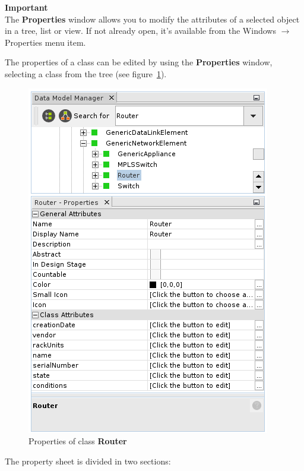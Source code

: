 \documentclass[a4paper]{article}
\begin{document}
			\begin{framed} {\large \textbf{Important}} \\
					The \textbf{Properties} window allows you to modify the attributes of a selected object in a tree, list or view. If not already open, it's available from the Windows $\rightarrow$ Properties menu item.
			\end{framed}
			The properties of a class can be edited by using the \textbf{Properties} window, selecting a class from the tree (see figure~\ref{fig:properties_class_node}). 
			\begin{figure}[h!]
				\centering
				\includegraphics[width=0.5\linewidth]{img/data_model_manager_properties_class_node.png}
				\caption{Properties of class \textbf{Router}}
				\label{fig:properties_class_node}
			\end{figure}
			The  property  sheet  is  divided  in  two  sections: 
\end{document}
